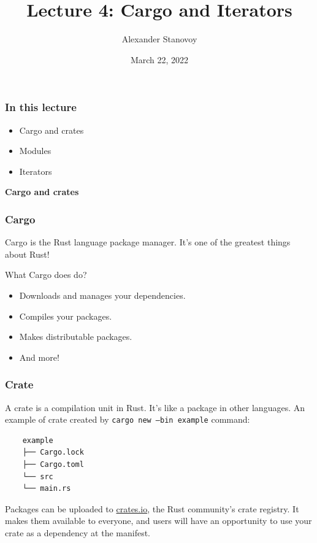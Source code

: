\documentclass[aspectratio=1610,t]{beamer}
\title{Lecture 4: Cargo and Iterators}
\date{March 22, 2022}
\author{Alexander Stanovoy}
\institute{alex.stanovoy@gmail.com}
\begin{document}

\begin{frame}
\maketitle
\end{frame}


\begin{frame}[fragile]
\frametitle{In this lecture}
\begin{itemize}
 \item Cargo and crates
 \item Modules
 \item Iterators
\end{itemize}
\end{frame}


\begin{frame}[c]
\centering\Huge\textbf{Cargo and crates}
\end{frame}


\begin{frame}[fragile]
\frametitle{Cargo}
Cargo is the Rust language package manager. It's one of the greatest things about Rust!

What Cargo does do?

\begin{itemize}
    \item Downloads and manages your dependencies.
    \item Compiles your packages.
    \item Makes distributable packages.
    \item And more!
\end{itemize}
\end{frame}


\begin{frame}[fragile]
\frametitle{Crate}
A crate is a compilation unit in Rust. It's like a package in other languages. An example of crate created by \texttt{cargo new --bin example} command:

\begin{verbatim}
    example
    ├── Cargo.lock
    ├── Cargo.toml
    └── src
    └── main.rs
\end{verbatim}

Packages can be uploaded to \href{https://crates.io}{crates.io}, the Rust community's crate registry. It makes them available to everyone, and users will have an opportunity to use your crate as a dependency at the manifest.
\end{frame}
\end{document}
